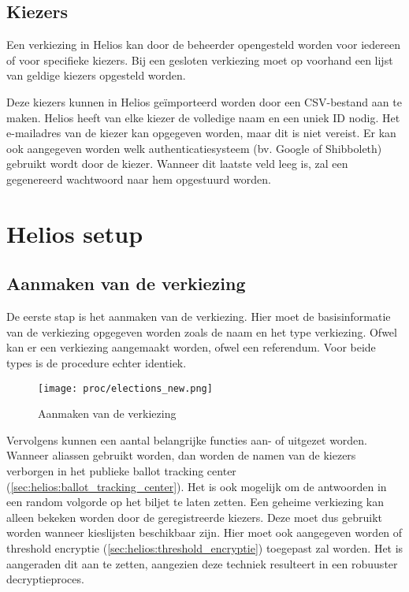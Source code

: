 \subsection{Kiezers}
\label{sec:proc:voorbereiding:kiezers}

Een verkiezing in Helios kan door de beheerder opengesteld worden voor iedereen of voor specifieke kiezers. Bij een gesloten verkiezing moet op voorhand een lijst van geldige kiezers opgesteld worden.

\npar Deze kiezers kunnen in Helios ge\"importeerd worden door een CSV-bestand aan te maken. Helios heeft van elke kiezer de volledige naam en een uniek ID nodig. Het e-mailadres van de kiezer kan opgegeven worden, maar dit is niet vereist. Er kan ook aangegeven worden welk authenticatiesysteem (bv. Google of Shibboleth) gebruikt wordt door de kiezer. Wanneer dit laatste veld leeg is, zal een gegenereerd wachtwoord naar hem opgestuurd worden.

\section{Helios setup}
\label{sec:proc:helios}

\subsection{Aanmaken van de verkiezing}

De eerste stap is het aanmaken van de verkiezing. Hier moet de basisinformatie van de verkiezing opgegeven worden zoals de naam en het type verkiezing. Ofwel kan er een verkiezing aangemaakt worden, ofwel een referendum. Voor beide types is de procedure echter identiek.

\begin{figure}
  \centering
  \texttt{[image: proc/elections\_new.png]}
  \caption{Aanmaken van de verkiezing}
  \label{fig:proc:elections_new}
\end{figure}

\npar Vervolgens kunnen een aantal belangrijke functies aan- of uitgezet worden. Wanneer aliassen gebruikt worden, dan worden de namen van de kiezers verborgen in het publieke ballot tracking center (\ref{sec:helios:ballot_tracking_center}). Het is ook mogelijk om de antwoorden in een random volgorde op het biljet te laten zetten. Een geheime verkiezing kan alleen bekeken worden door de geregistreerde kiezers. Deze moet dus gebruikt worden wanneer kieslijsten beschikbaar zijn. Hier moet ook aangegeven worden of threshold encryptie  (\ref{sec:helios:threshold_encryptie}) toegepast zal worden. Het is aangeraden dit aan te zetten, aangezien deze techniek resulteert in een robuuster decryptieproces.

